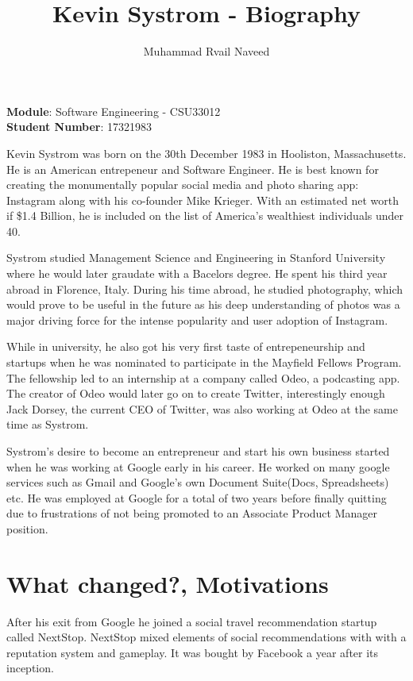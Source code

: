 \documentclass[12pt]{article}
\title{\textbf{Kevin  Systrom -  Biography}}
\author{Muhammad Rvail Naveed}
\date{}
\begin{document}
    \maketitle

    \begin{center}
        \textbf{Module}: Software Engineering - CSU33012 \\
        \textbf{Student Number}: 17321983 
    \end{center}

    \newpage

    Kevin Systrom was born on the 30th December 1983 in Hooliston, Massachusetts. He is 
    an American entrepeneur and Software Engineer. He is best known for creating the monumentally
    popular social media and photo sharing app: Instagram along with his co-founder Mike Krieger. With an estimated net
    worth if \$1.4 Billion, he is included on the list of America's wealthiest individuals under 40.

    Systrom studied Management Science and Engineering in Stanford University 
    where he would later graudate with a Bacelors degree. He spent his third year abroad in Florence, Italy.
    During his time abroad, he studied photography, which would prove to be useful in the future as his deep understanding of photos
    was a major driving force for the intense popularity and user adoption of Instagram.

    While in university, 
    he also got his very first taste of entrepeneurship 
    and startups when he was nominated to participate in the Mayfield Fellows Program. 
    The fellowship led to an internship at a company called Odeo, a podcasting app. The creator of Odeo
    would later go on to create Twitter, interestingly enough Jack Dorsey, the current CEO of Twitter, 
    was also working at Odeo at the same time as Systrom.

    Systrom's desire to become an entrepreneur
    and start his own business started when he was working at Google early in his career. He worked on many google services such as Gmail and Google's own
    Document Suite(Docs, Spreadsheets) etc. He was employed at Google for a total of two years before finally quitting
    due to frustrations of not being promoted to an Associate Product Manager position.

    \section{What changed?, Motivations}
    After his exit from Google he joined a social travel recommendation startup called 
    NextStop. NextStop mixed elements of social recommendations with
    with a reputation system and gameplay. It was bought by Facebook a year after its inception.
\end{document}
